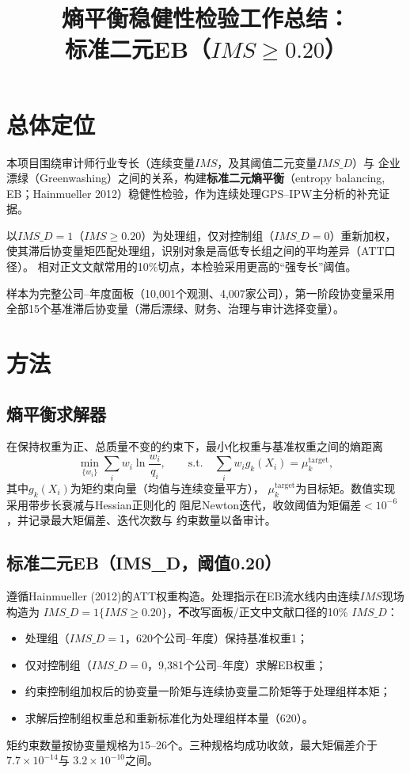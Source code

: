 \documentclass[11pt]{article}
\title{熵平衡稳健性检验工作总结：\\标准二元EB（\(IMS\ge0.20\)）}
\begin{document}
\maketitle
\tableofcontents

\section{总体定位}

本项目围绕审计师行业专长（连续变量\(IMS\)，及其阈值二元变量\(IMS\_D\)）与
企业漂绿（Greenwashing）之间的关系，构建\textbf{标准二元熵平衡}（entropy balancing,
EB；Hainmueller 2012）稳健性检验，作为连续处理GPS--IPW主分析的补充证据。

以\(IMS\_D=1\)（\(IMS\ge0.20\)）为处理组，仅对控制组（\(IMS\_D=0\)）重新加权，
使其滞后协变量矩匹配处理组，识别对象是高低专长组之间的平均差异（ATT口径）。
相对正文文献常用的10\%切点，本检验采用更高的``强专长''阈值。

样本为完整公司--年度面板（10,001个观测、4,007家公司），第一阶段协变量采用
全部15个基准滞后协变量（滞后漂绿、财务、治理与审计选择变量）。

\section{方法}

\subsection{熵平衡求解器}

在保持权重为正、总质量不变的约束下，最小化权重与基准权重之间的熵距离
\[
\min_{\{w_i\}}\sum_i w_i\ln\frac{w_i}{q_i},
\qquad
\text{s.t.}\quad \sum_i w_i g_k(X_i)=\mu_k^{\text{target}},
\]
其中\(g_k(X_i)\)为矩约束向量（均值与连续变量平方），
\(\mu_k^{\text{target}}\)为目标矩。数值实现采用带步长衰减与Hessian正则化的
阻尼Newton迭代，收敛阈值为矩偏差\(<10^{-6}\)，并记录最大矩偏差、迭代次数与
约束数量以备审计。

\subsection{标准二元EB（IMS\_D，阈值0.20）}

遵循Hainmueller (2012)的ATT权重构造。处理指示在EB流水线内由连续\(IMS\)现场构造为
\(IMS\_D=1\{IMS\ge0.20\}\)，\textbf{不}改写面板/正文中文献口径的10\% \(IMS\_D\)：
\begin{itemize}
  \item 处理组（\(IMS\_D=1\)，620个公司--年度）保持基准权重1；
  \item 仅对控制组（\(IMS\_D=0\)，9,381个公司--年度）求解EB权重；
  \item 约束控制组加权后的协变量一阶矩与连续协变量二阶矩等于处理组样本矩；
  \item 求解后控制组权重总和重新标准化为处理组样本量（620）。
\end{itemize}
矩约束数量按协变量规格为15--26个。三种规格均成功收敛，最大矩偏差介于\(7.7\times10^{-14}\)与
\(3.2\times10^{-10}\)之间。
\end{document}
